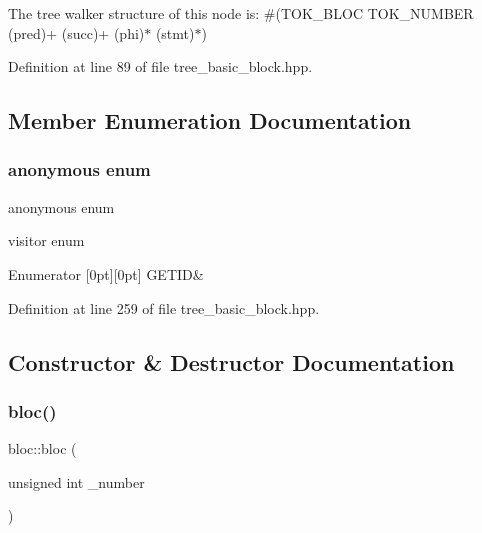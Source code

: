 The tree walker structure of this node is\+: \#(T\+O\+K\+\_\+\+B\+L\+OC T\+O\+K\+\_\+\+N\+U\+M\+B\+ER (pred)+ (succ)+ (phi)$\ast$ (stmt)$\ast$) 

Definition at line 89 of file tree\+\_\+basic\+\_\+block.\+hpp.



\subsection{Member Enumeration Documentation}
\mbox{\label{structbloc_abbf52ab98f89180bba2ab03929dd3b11}} 
\subsubsection{\texorpdfstring{anonymous enum}{anonymous enum}}
{\footnotesize\ttfamily anonymous enum}



visitor enum 

\begin{DoxyEnumFields}{Enumerator}
[0pt][0pt]{}\mbox{\label{structbloc_abbf52ab98f89180bba2ab03929dd3b11acdd45e3b7c8dd80471c324de1481aa2f}} 
G\+E\+T\+ID&\\
\hline

\end{DoxyEnumFields}


Definition at line 259 of file tree\+\_\+basic\+\_\+block.\+hpp.



\subsection{Constructor \& Destructor Documentation}
\mbox{\label{structbloc_af2b131aef8fd51742dc6f4c34b303a88}} 
\subsubsection{\texorpdfstring{bloc()}{bloc()}}
{\footnotesize\ttfamily bloc\+::bloc (\begin{DoxyParamCaption}\item[{unsigned int}]{\+\_\+number }\end{DoxyParamCaption})\hspace{0.3cm}{\ttfamily [explicit]}}



